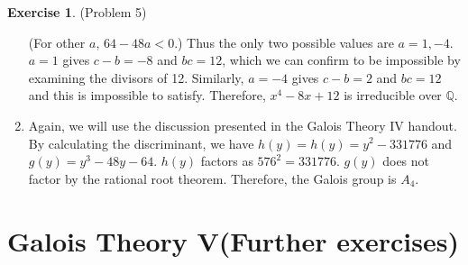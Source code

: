 \documentclass[12pt, psamsfonts]{amsart}
\theoremstyle{definition}
\newtheorem*{exer}{Exercise}
\theoremstyle{remark}
\numberwithin{equation}{section}
\begin{document}
\begin{exer}{(Problem 5)}
\begin{enumerate}[label=(\roman*)]
      (For other $a$, $64 - 48a < 0$.)
      Thus the only two possible values are $a = 1, -4$.
      $a = 1$ gives $c - b = -8$ and $bc = 12$, which we can confirm to be impossible by examining the divisors of 12.
      Similarly, $a = -4$ gives $c - b = 2$ and $bc = 12$ and this is impossible to satisfy.
      Therefore, $x^4 - 8x + 12$ is irreducible over $\mathbb{Q}$.
    \item
      Again, we will use the discussion presented in the Galois Theory IV handout.
      By calculating the discriminant, we have $h(y) = h(y) = y^{2} - 331776$ and $g(y) = y^{3} - 48 y - 64$.
      $h(y)$ factors as $576^2 = 331776$.
      $g(y)$ does not factor by the rational root theorem.
      Therefore, the Galois group is $A_4$.
  \end{enumerate}
\end{exer}

\section{Galois Theory V(Further exercises)}
\end{document}
